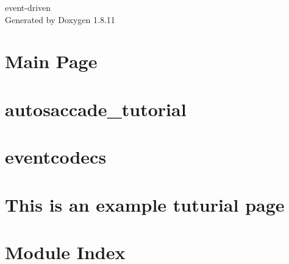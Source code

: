 \documentclass[twoside]{book}
\newcommand{\+}{\discretionary{\mbox{\scriptsize$\hookleftarrow$}}{}{}}
\newcommand{\clearemptydoublepage}{%
  \newpage{\pagestyle{empty}\cleardoublepage}%
}
\begin{document}
\hypersetup{pageanchor=false,
             bookmarksnumbered=true,
             pdfencoding=unicode
            }
\begin{titlepage}
\vspace*{7cm}
\begin{center}%
{\Large event-\/driven }\\
\vspace*{1cm}
{\large Generated by Doxygen 1.8.11}\\
\end{center}
\end{titlepage}
\clearemptydoublepage
\tableofcontents
\clearemptydoublepage
{}
\hypersetup{pageanchor=true}

\chapter{Main Page}
\label{index}\hypertarget{index}{}
\chapter{autosaccade\+\_\+tutorial}
\label{md__home_aglover_workspace_projects_event-driven_documentation_autosaccade_tutorial}
\hypertarget{md__home_aglover_workspace_projects_event-driven_documentation_autosaccade_tutorial}{}

\chapter{eventcodecs}
\label{md__home_aglover_workspace_projects_event-driven_documentation_eventcodecs}
\hypertarget{md__home_aglover_workspace_projects_event-driven_documentation_eventcodecs}{}

\chapter{This is an example tuturial page}
\label{md__home_aglover_workspace_projects_event-driven_documentation_tutorial}
\hypertarget{md__home_aglover_workspace_projects_event-driven_documentation_tutorial}{}

\chapter{Module Index}

\end{document}
